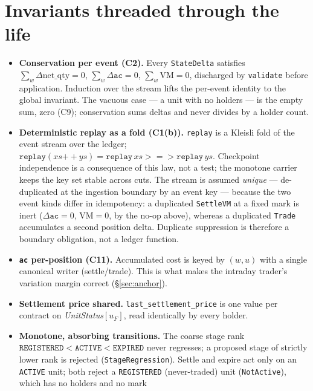 \documentclass[11pt]{article}
\newcommand{\ac}{\texttt{ac}}
\newcommand{\netq}{\mathrm{net\_qty}}
\newcommand{\code}[1]{\texttt{#1}}
\newcommand{\unit}{u_{F}}
\begin{document}
\section{Invariants threaded through the life}
\label{sec:invariants}

\begin{itemize}
\item \textbf{Conservation per event (C2).} Every \code{StateDelta} satisfies
$\sum_w\Delta\netq=0$, $\sum_w\Delta\ac=0$, $\sum_w\mathrm{VM}=0$, discharged by \code{validate}
before application. Induction over the stream lifts the per-event identity to the global invariant.
The vacuous case --- a unit with no holders --- is the empty sum, zero (C9); conservation sums
deltas and never divides by a holder count.
\item \textbf{Deterministic replay as a fold (C1(b)).} \code{replay} is a Kleisli fold of the event
stream over the ledger; $\code{replay}(xs\mathbin{+\!\!+}ys)=\code{replay}\,xs \mathbin{>\!=\!>}
\code{replay}\,ys$. Checkpoint independence is a consequence of this law, not a test; the monotone
carrier keeps the key set stable across cuts. The stream is assumed \emph{unique} --- de-duplicated at
the ingestion boundary by an event key --- because the two event kinds differ in idempotency: a
duplicated \code{SettleVM} at a fixed mark is inert ($\Delta\ac=0$, $\mathrm{VM}=0$, by the no-op
above), whereas a duplicated \code{Trade} accumulates a second position delta. Duplicate suppression is
therefore a boundary obligation, not a ledger function.
\item \textbf{\ac{} per-position (C11).} Accumulated cost is keyed by $(w,u)$ with a single canonical
writer (settle/trade). This is what makes the intraday trader's variation margin correct
(\S\ref{sec:anchor}).
\item \textbf{Settlement price shared.} \code{last\_settlement\_price} is one value per contract on
\emph{UnitStatus}$[\unit]$, read identically by every holder.
\item \textbf{Monotone, absorbing transitions.} The coarse stage rank
$\code{REGISTERED}<\code{ACTIVE}<\code{EXPIRED}$ never regresses; a proposed stage of strictly lower
rank is rejected (\code{StageRegression}). Settle and expire act only on an \code{ACTIVE} unit; both
reject a \code{REGISTERED} (never-traded) unit (\code{NotActive}), which has no holders and no mark

\end{itemize}
\end{document}
